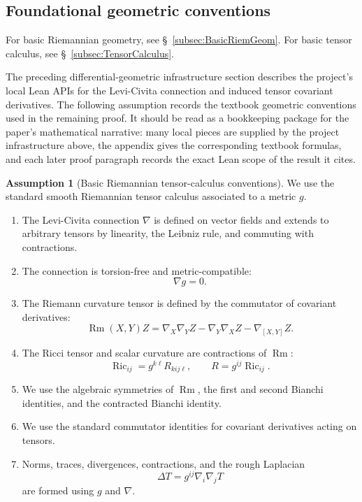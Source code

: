 \documentclass[11pt]{article}
\theoremstyle{plain}
\theoremstyle{definition}
\newtheorem{assumption}[theorem]{Assumption}
\theoremstyle{remark}
\newcommand{\Ric}{\operatorname{Ric}}
\newcommand{\Rm}{\operatorname{Rm}}
\begin{document}
\subsection{Foundational geometric conventions}

For basic Riemannian geometry, see \S~\ref{subsec:BasicRiemGeom}.  For basic
tensor calculus, see \S~\ref{subsec:TensorCalculus}.

The preceding differential-geometric infrastructure section describes the
project's local Lean APIs for the Levi-Civita connection and induced tensor
covariant derivatives.  The following assumption records the textbook geometric
conventions used in the remaining proof.  It should be read as a bookkeeping
package for the paper's mathematical narrative: many local pieces are supplied
by the project infrastructure above, the appendix gives the corresponding
textbook formulas, and each later proof paragraph records the exact Lean scope
of the result it cites.

\begin{assumption}[Basic Riemannian tensor-calculus conventions]
\label{ass:riemannian-calculus}
We use the standard smooth Riemannian tensor calculus associated to a metric
$g$.
\begin{enumerate}[label=(\arabic*)]
  \item The Levi-Civita connection $\nabla$ is defined on vector fields and
  extends to arbitrary tensors by linearity, the Leibniz rule, and commuting
  with contractions.

  \item The connection is torsion-free and metric-compatible:
  \[
  \nabla g=0.
  \]

  \item The Riemann curvature tensor is defined by the commutator of covariant
  derivatives:
  \[
  \Rm(X,Y)Z
  =
  \nabla_X\nabla_YZ
  -\nabla_Y\nabla_XZ
  -\nabla_{[X,Y]}Z.
  \]

  \item The Ricci tensor and scalar curvature are contractions of $\Rm$:
  \[
  \Ric_{ij}=g^{k\ell}R_{kij\ell},
  \qquad
  R=g^{ij}\Ric_{ij}.
  \]

  \item We use the algebraic symmetries of $\Rm$, the first and second Bianchi
  identities, and the contracted Bianchi identity.

  \item We use the standard commutator identities for covariant derivatives
  acting on tensors.

  \item Norms, traces, divergences, contractions, and the rough Laplacian
  \[
  \Delta T=g^{ij}\nabla_i\nabla_jT
  \]
  are formed using $g$ and $\nabla$.
\end{enumerate}
\end{assumption}
\end{document}
